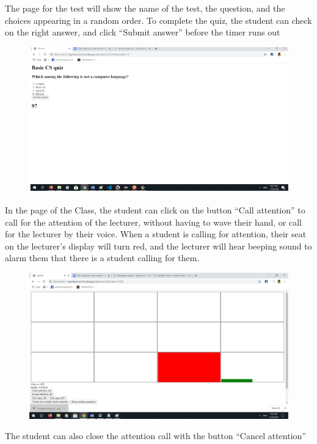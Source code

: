 \documentclass[a4paper, 11pt,openany]{book} %
\begin{document}
The page for the test will show the name of the test, the question, and the choices appearing in a random order. To complete the quiz, the student can check on the right answer, and click “Submit answer” before the timer runs out
\begin{figure}[H]
    \centering
    \includegraphics[width=\textwidth,height=\textheight,keepaspectratio]{images/26.png}
\end{figure}
In the page of the Class, the student can click on the button “Call attention” to call for the attention of the lecturer, without having to wave their hand, or call for the lecturer by their voice. When a student is calling for attention, their seat on the lecturer’s display will turn red, and the lecturer will hear beeping sound to alarm them that there is a student calling for them.
\begin{figure}[H]
    \centering
    \includegraphics[width=\textwidth,height=\textheight,keepaspectratio]{images/27.png}
\end{figure}
The student can also close the attention call with the button “Cancel attention”	
\end{document}
